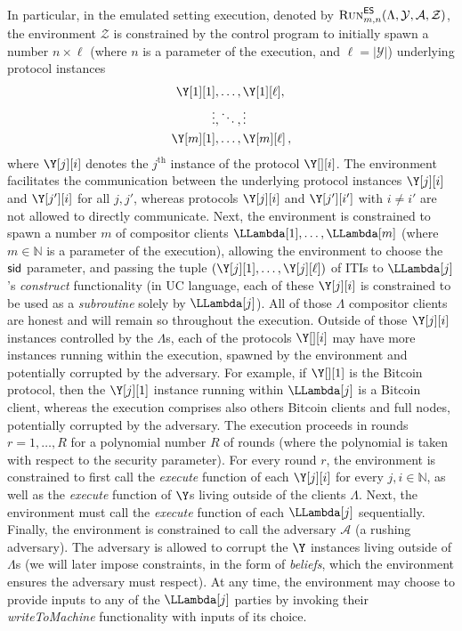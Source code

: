 In particular, in the emulated setting execution, denoted by $\textsc{Run}^{\textsf{ES}}_{m,n}(\Lambda, \mathcal{Y}, \mathcal{A}, \mathcal{Z})$,
the environment $\mathcal{Z}$ is constrained by the control program
to initially
spawn a number $n \times \ell$ (where $n$ is a parameter of the execution,
and $\ell = |\mathcal{Y}|$)
underlying protocol instances
\begin{align*}
\Y[1][1], &\ldots, \Y[1][\ell],\\
  \vdots, &\ddots, \vdots      \\
\Y[m][1], &\ldots, \Y[m][\ell]\,,
\end{align*}
where $\Y[j][i]$ denotes the $j^\text{th}$ instance of
the protocol $\Y[][i]$. The environment facilitates the communication
between the underlying protocol instances $\Y[j][i]$ and $\Y[j'][i]$
for all $j, j'$, whereas protocols $\Y[j][i]$ and $\Y[j'][i']$
with $i \neq i'$ are not allowed to directly communicate.
Next, the environment is constrained to spawn
a number $m$ of compositor clients
$\LLambda[1], \ldots, \LLambda[m]$ (where $m \in \mathbb{N}$
is a parameter of the execution), allowing
the environment to choose the $\textsf{sid}$ parameter,
and passing the tuple $(\Y[j][1], \ldots, \Y[j][\ell])$ of ITIs
to $\LLambda[j]$'s \emph{construct} functionality
(in UC language, each of these $\Y[j][i]$ is constrained to be used
as a \emph{subroutine} solely by $\LLambda[j]$).
All of those $\Lambda$ compositor clients are honest and will remain
so throughout the execution.
Outside of those $\Y[j][i]$ instances controlled by the $\Lambda$s, each of
the protocols $\Y[][i]$ may have more instances running within the execution,
spawned by the environment and potentially corrupted by the adversary.
For example, if $\Y[][1]$ is the Bitcoin protocol, then the $\Y[j][1]$
instance running within $\LLambda[j]$ is a Bitcoin client, whereas the
execution comprises also others Bitcoin clients and full nodes, potentially
corrupted by the adversary.
The execution proceeds in rounds $r = 1, \ldots, R$
for a polynomial number $R$ of rounds (where the polynomial
is taken with respect to the security parameter). For every
round $r$, the environment is constrained to first call
the \emph{execute} function of each $\Y[j][i]$ for every
$j, i \in \mathbb{N}$, as well as the \emph{execute} function of $\Y$s
living outside of the clients $\Lambda$. Next, the environment must call
the \emph{execute} function of each $\LLambda[j]$ sequentially.
Finally, the environment is constrained to call the
adversary $\mathcal{A}$ (a rushing adversary).
The adversary is allowed to corrupt the $\Y$ instances living outside of $\Lambda$s
(we will later impose constraints, in the form of \emph{beliefs}, which the
environment ensures the adversary must respect).
At any time, the environment may choose to provide inputs
to any of the $\LLambda[j]$ parties by invoking their \emph{writeToMachine}
functionality with inputs of its choice.

